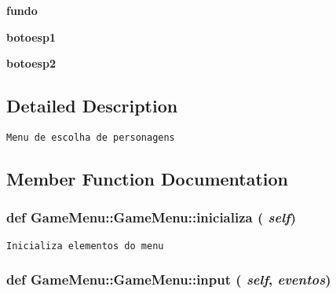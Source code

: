 \begin{CompactItemize}
\item 
\hypertarget{class_game_menu_1_1_game_menu_71420a0cd79c4cdf81cdfc47d321f30a}{
\textbf{fundo}}
\label{class_game_menu_1_1_game_menu_71420a0cd79c4cdf81cdfc47d321f30a}

\item 
\hypertarget{class_game_menu_1_1_game_menu_5996ca951c12d671c555e6ae815b7dcc}{
\textbf{botoesp1}}
\label{class_game_menu_1_1_game_menu_5996ca951c12d671c555e6ae815b7dcc}

\item 
\hypertarget{class_game_menu_1_1_game_menu_33aadf5efe7c6aaad921685e92a65d11}{
\textbf{botoesp2}}
\label{class_game_menu_1_1_game_menu_33aadf5efe7c6aaad921685e92a65d11}

\end{CompactItemize}


\subsection{Detailed Description}


\begin{footnotesize}\begin{verbatim}Menu de escolha de personagens\end{verbatim}
\end{footnotesize}
 

\subsection{Member Function Documentation}
\hypertarget{class_game_menu_1_1_game_menu_5161d405aa508fdc1e2a81d7513fd75e}{
\subsubsection[{inicializa}]{\setlength{\rightskip}{0pt plus 5cm}def GameMenu::GameMenu::inicializa ( {\em self})}}
\label{class_game_menu_1_1_game_menu_5161d405aa508fdc1e2a81d7513fd75e}




\begin{footnotesize}\begin{verbatim}Inicializa elementos do menu\end{verbatim}
\end{footnotesize}
 \hypertarget{class_game_menu_1_1_game_menu_124d43216383f2fb6959cb6afdb0f080}{
\subsubsection[{input}]{\setlength{\rightskip}{0pt plus 5cm}def GameMenu::GameMenu::input ( {\em self}, \/   {\em eventos})}}
\label{class_game_menu_1_1_game_menu_124d43216383f2fb6959cb6afdb0f080}




